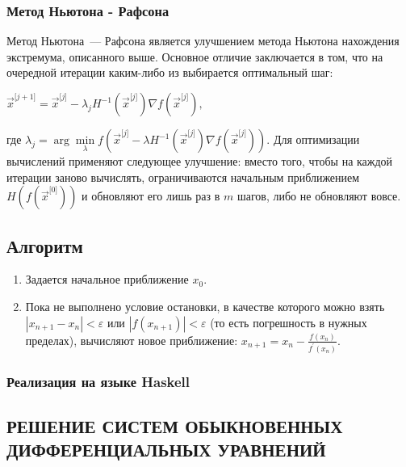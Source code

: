 \documentclass[a4paper]{article}
\begin{document}
{{{{{{{{\subsubsection{Метод Ньютона - Рафсона}
Метод Ньютона~--- Рафсона является улучшением метода Ньютона нахождения
экстремума, описанного выше. Основное отличие заключается в том, что на
очередной итерации каким-либо из выбирается оптимальный шаг:

{{\({\overset{\rightarrow}{x}}^{\lbrack j + 1\rbrack} = {\overset{\rightarrow}{x}}^{\lbrack j\rbrack} - \lambda_{j}H^{- 1}({\overset{\rightarrow}{x}}^{\lbrack j\rbrack})\nabla f({\overset{\rightarrow}{x}}^{\lbrack j\rbrack}),\)}}

где
{{\(\lambda_{j} = \arg\min\limits_{\lambda}f({\overset{\rightarrow}{x}}^{\lbrack j\rbrack} - \lambda H^{- 1}({\overset{\rightarrow}{x}}^{\lbrack j\rbrack})\nabla f({\overset{\rightarrow}{x}}^{\lbrack j\rbrack})).\)}}
Для оптимизации вычислений применяют следующее улучшение: вместо того,
чтобы на каждой итерации заново вычислять, ограничиваются начальным
приближением {{\(H(f({\overset{\rightarrow}{x}}^{\lbrack 0\rbrack}))\)}}
и обновляют его лишь раз в {{\(m\)}} шагов, либо не обновляют вовсе.

\subsection{Алгоритм}

\begin{enumerate}
    \item Задается начальное приближение {\(x_{0}\)}.
    \item Пока не выполнено условие остановки, в качестве которого можно взять {\(|x_{n + 1} - x_{n}| < \varepsilon\)} или {\(|f(x_{n + 1})| < \varepsilon\)} (то есть погрешность в нужных пределах), вычисляют новое приближение: {\(x_{n + 1} = x_{n} - \frac{f(x_{n})}{f^{\prime}(x_{n})}\)}.
\end{enumerate}

\subsubsection{Реализация на языке Haskell}



\newpage

\begin{center}
 \section{РЕШЕНИЕ СИСТЕМ ОБЫКНОВЕННЫХ ДИФФЕРЕНЦИАЛЬНЫХ УРАВНЕНИЙ}
\end{center}

}}}}}}}}
\end{document}
